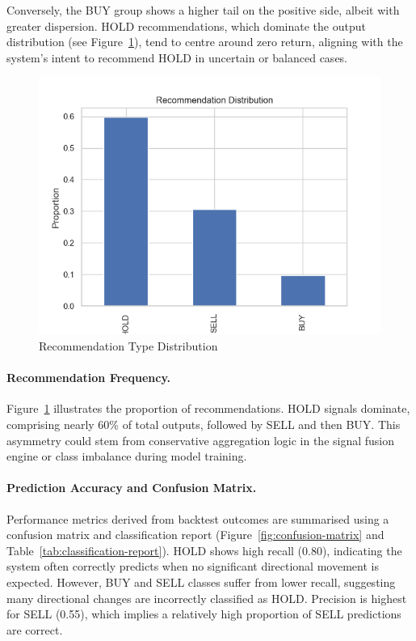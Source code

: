 \FloatBarrier

Conversely, the BUY group shows a higher tail on the positive side, albeit with greater dispersion. HOLD recommendations, which dominate the output distribution (see Figure~\ref{fig:rec_dist}), tend to centre around zero return, aligning with the system's intent to recommend HOLD in uncertain or balanced cases.

\begin{figure}[h]
  \centering
  \includegraphics[width=0.6\linewidth]{assets/recommendation_distribution.png}
  \caption{Recommendation Type Distribution}
  \label{fig:rec_dist}
\end{figure}

\paragraph{Recommendation Frequency.}  
Figure~\ref{fig:rec_dist} illustrates the proportion of recommendations. HOLD signals dominate, comprising nearly 60\% of total outputs, followed by SELL and then BUY. This asymmetry could stem from conservative aggregation logic in the signal fusion engine or class imbalance during model training.

\paragraph{Prediction Accuracy and Confusion Matrix.}  
Performance metrics derived from backtest outcomes are summarised using a confusion matrix  and classification report (Figure~\ref{fig:confusion-matrix} and Table~\ref{tab:classification-report}). HOLD shows high recall (0.80), indicating the system often correctly predicts when no significant directional movement is expected. However, BUY and SELL classes suffer from lower recall, suggesting many directional changes are incorrectly classified as HOLD. Precision is highest for SELL (0.55), which implies a relatively high proportion of SELL predictions are correct.

